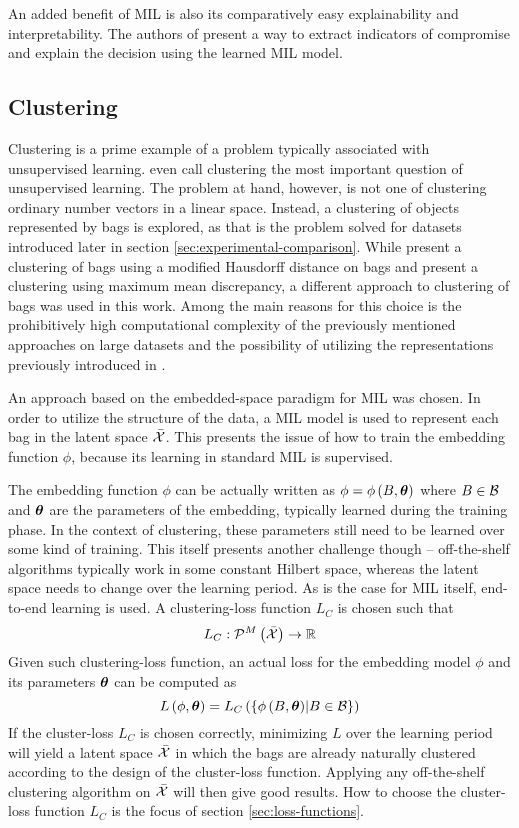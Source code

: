 An added benefit of MIL is also its comparatively easy explainability and interpretability. The authors of \cite{pevny_nested_2020} present a way to extract indicators of compromise and explain the decision using the learned MIL model.

\subsection{Clustering}
Clustering is a prime example of a problem typically associated with unsupervised learning. \cite{xu_comprehensive_2015} even call clustering the most important question of unsupervised learning. The problem at hand, however, is not one of clustering ordinary number vectors in a linear space. Instead, a clustering of objects represented by bags is explored, as that is the problem solved for datasets introduced later in section \ref{sec:experimental-comparison}. While \cite{wang_solving_2000} present a clustering of bags using a modified Hausdorff distance on bags and \cite{kohout_network_2018} present a clustering using maximum mean discrepancy, a different approach to clustering of bags was used in this work. Among the main reasons for this choice is the prohibitively high computational complexity of the previously mentioned approaches on large datasets and the possibility of utilizing the representations previously introduced in \cite{pevny_nested_2020}.

An approach based on the embedded-space paradigm for MIL was chosen. In order to utilize the structure of the data, a MIL model is used to represent each bag in the latent space \( \bar{\mathcal{X}} \). This presents the issue of how to train the embedding function \( \phi \), because its learning in standard MIL is supervised.

The embedding function \( \phi \) can be actually written as \( \phi = \phi \left( B, \bm{\theta} \right) \) where \( B \in \mathcal{B} \) and \( \bm{\theta} \) are the parameters of the embedding, typically learned during the training phase. In the context of clustering, these parameters still need to be learned over some kind of training. This itself presents another challenge though -- off-the-shelf algorithms typically work in some constant Hilbert space, whereas the latent space needs to change over the learning period. As is the case for MIL itself, end-to-end learning is used. A clustering-loss function \( L_C \) is chosen such that
\[ L_C: \mathcal{P}^M \left( \bar{\mathcal{X}} \right) \to \mathbb{R} \]
Given such clustering-loss function, an actual loss for the embedding model \( \phi \) and its parameters \( \bm{\theta} \) can be computed as
\[ L \left( \phi, \bm{\theta} \right) = L_C \left( \left\{ \phi \left( B, \bm{\theta} \right) \middle| B \in \mathcal{B} \right\} \right) \]
If the cluster-loss \( L_C \) is chosen correctly, minimizing \( L \) over the learning period will yield a latent space \( \bar{\mathcal{X}} \) in which the bags are already naturally clustered according to the design of the cluster-loss function. Applying any off-the-shelf clustering algorithm on \( \bar{\mathcal{X}} \) will then give good results. How to choose the cluster-loss function \( L_C \) is the focus of section \ref{sec:loss-functions}.

